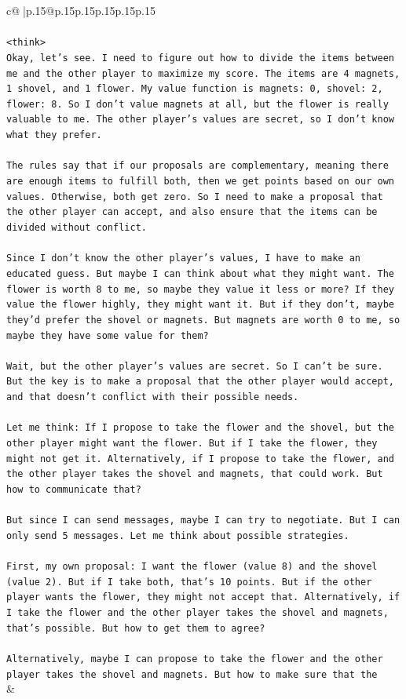 \documentclass{article}
\begin{document}
{\begin{supertabular}{c@{$\;$}|p{.15\linewidth}@{}p{.15\linewidth}p{.15\linewidth}p{.15\linewidth}p{.15\linewidth}p{.15\linewidth}}
{{{\\ 
\\ 
\texttt{<think>} \\
\texttt{Okay, let's see. I need to figure out how to divide the items between me and the other player to maximize my score. The items are 4 magnets, 1 shovel, and 1 flower. My value function is magnets: 0, shovel: 2, flower: 8. So I don't value magnets at all, but the flower is really valuable to me. The other player's values are secret, so I don't know what they prefer.} \\
\\ 
\texttt{The rules say that if our proposals are complementary, meaning there are enough items to fulfill both, then we get points based on our own values. Otherwise, both get zero. So I need to make a proposal that the other player can accept, and also ensure that the items can be divided without conflict.} \\
\\ 
\texttt{Since I don't know the other player's values, I have to make an educated guess. But maybe I can think about what they might want. The flower is worth 8 to me, so maybe they value it less or more? If they value the flower highly, they might want it. But if they don't, maybe they'd prefer the shovel or magnets. But magnets are worth 0 to me, so maybe they have some value for them?} \\
\\ 
\texttt{Wait, but the other player's values are secret. So I can't be sure. But the key is to make a proposal that the other player would accept, and that doesn't conflict with their possible needs.} \\
\\ 
\texttt{Let me think: If I propose to take the flower and the shovel, but the other player might want the flower. But if I take the flower, they might not get it. Alternatively, if I propose to take the flower, and the other player takes the shovel and magnets, that could work. But how to communicate that?} \\
\\ 
\texttt{But since I can send messages, maybe I can try to negotiate. But I can only send 5 messages. Let me think about possible strategies.} \\
\\ 
\texttt{First, my own proposal: I want the flower (value 8) and the shovel (value 2). But if I take both, that's 10 points. But if the other player wants the flower, they might not accept that. Alternatively, if I take the flower and the other player takes the shovel and magnets, that's possible. But how to get them to agree?} \\
\\ 
\texttt{Alternatively, maybe I can propose to take the flower and the other player takes the shovel and magnets. But how to make sure that the} \\
            }
        }
    }
    & \\ \\


\end{supertabular}}
\end{document}
